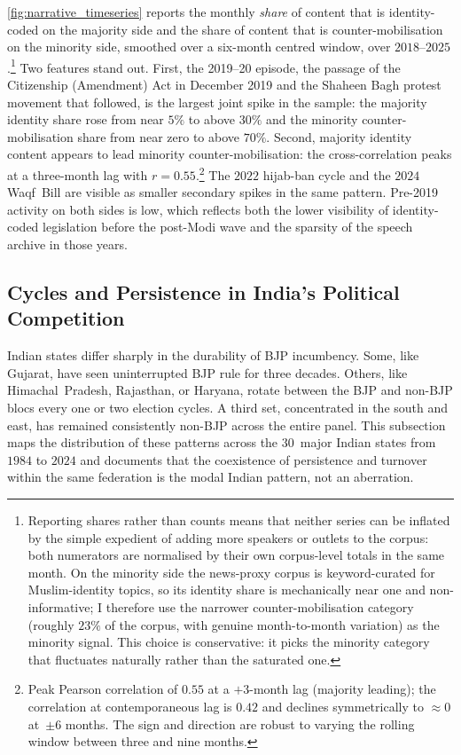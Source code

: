 \autoref{fig:narrative_timeseries} reports the monthly \emph{share} of
content that is identity-coded on the majority side and the share of
content that is counter-mobilisation on the minority side, smoothed over a
six-month centred window, over $2018$--$2025$.\footnote{Reporting shares
rather than counts means that neither series can be inflated by the simple
expedient of adding more speakers or outlets to the corpus: both
numerators are normalised by their own corpus-level totals in the same
month. On the minority side the news-proxy corpus is keyword-curated for
Muslim-identity topics, so its identity share is mechanically near one and
non-informative; I therefore use the narrower counter-mobilisation
category (roughly $23\%$ of the corpus, with genuine month-to-month
variation) as the minority signal. This choice is conservative: it picks
the minority category that fluctuates naturally rather than the
saturated one.} Two features stand out. First, the 2019--20 episode, the
passage of the Citizenship (Amendment) Act in December 2019 and the
Shaheen Bagh protest movement that followed, is the largest joint
spike in the sample: the majority identity share rose from near $5\%$ to
above $30\%$ and the minority counter-mobilisation share from near zero to
above $70\%$. Second, majority identity content appears to lead minority
counter-mobilisation: the cross-correlation peaks at a three-month lag
with $r = 0.55$.\footnote{Peak Pearson correlation of $0.55$ at a $+3$-month
lag (majority leading); the correlation at contemporaneous lag is $0.42$
and declines symmetrically to $\approx 0$ at~$\pm 6$ months. The sign and
direction are robust to varying the rolling window between three and nine
months.} The $2022$ hijab-ban cycle and the $2024$ Waqf~Bill are visible as
smaller secondary spikes in the same pattern. Pre-2019 activity on both
sides is low, which reflects both the lower visibility of identity-coded
legislation before the post-Modi wave and the sparsity of the speech
archive in those years.

\subsection{Cycles and Persistence in India's Political Competition}
\label{subsec:cycles}

Indian states differ sharply in the durability of BJP incumbency. Some,
like Gujarat, have seen uninterrupted BJP rule for three decades. Others,
like Himachal~Pradesh, Rajasthan, or Haryana, rotate between the BJP and
non-BJP blocs every one or two election cycles. A third set, concentrated
in the south and east, has remained consistently non-BJP across the entire
panel. This subsection maps the distribution of these patterns across the
$30$~major Indian states from $1984$ to $2024$ and documents that the
coexistence of persistence and turnover within the same federation is the
modal Indian pattern, not an aberration.

